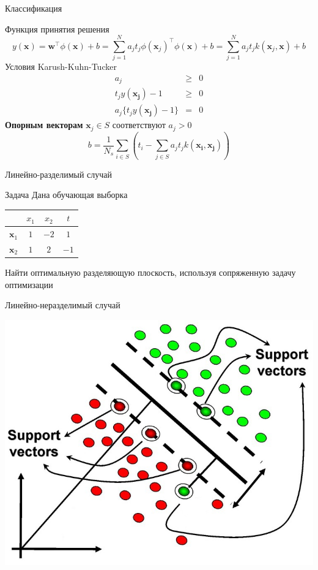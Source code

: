 \documentclass[aspectratio=169]{beamer}
\begin{document}
\begin{frame}{Классификация}

Функция принятия решения
\[
y(\mathbf{x}) = \mathbf{w}^\top \phi(\mathbf{x}) + b = \sum_{j=1}^N a_j t_j \phi(\mathbf{x}_j)^\top  \phi(\mathbf{x}) + b = \sum_{j=1}^N a_j t_j k(\mathbf{x}_j, \mathbf{x}) + b
\]
Условия Karush-Kuhn-Tucker
\begin{eqnarray*}
a_j &\geq& 0 \\
t_j y(\mathbf{x_j}) - 1 &\geq& 0 \\
a_j \{t_j y(\mathbf{x_j}) - 1\} &=& 0
\end{eqnarray*}
{\bf Опорным векторам} $\mathbf{x}_j \in S$ соответствуют $a_j > 0$
\[
b = \frac{1}{N_s} \sum_{i \in S} \left( t_i - \sum_{j \in S} a_j t_j k(\mathbf{x_i}, \mathbf{x_j})\right)
\]

\end{frame}

\begin{frame}{Линейно-разделимый случай}

\begin{block}{Задача}
Дана обучающая выборка

\begin{center}
\begin{tabular}{l|cc|c}
 & $x_1$ & $x_2$ & $t$ \\
 \hline
$\mathbf{x}_1$ & $1$ & $-2$ & $1$ \\
$\mathbf{x}_2$ & $1$ & $2$ & $-1$ \\
\end{tabular}
\end{center}

Найти оптимальную разделяющую плоскость, используя сопряженную задачу оптимизации

\end{block}

\end{frame}

\begin{frame}{Линейно-неразделимый случай}

\begin{center}
\includegraphics[scale=0.45]{images/svm.jpg}
\end{center}

\end{frame}
\end{document}
